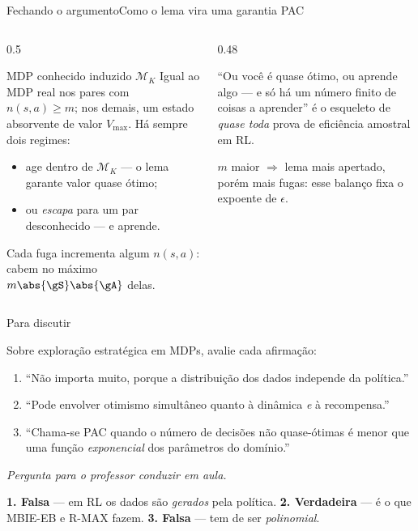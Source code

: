 \documentclass[aspectratio=169, 11pt]{beamer}
\newcommand{\paradiscussao}{\smallskip
  {\footnotesize\color{rlCinza}\itshape Pergunta para o professor conduzir em aula.}}
\newcommand{\Vmax}{V_{\max}}
\newcommand{\Mdp}{\mathcal{M}}
\begin{document}
\begin{frame}{Fechando o argumento}{Como o lema vira uma garantia PAC}
  \begin{columns}[T]
    \begin{column}{0.5\textwidth}
      \begin{defbox}{MDP conhecido induzido $\Mdp_K$}
        Igual ao MDP real nos pares com $n(s,a)\ge m$; nos demais, um estado absorvente
        de valor $\Vmax$. Há sempre dois regimes:
        \begin{itemize}
          \item age dentro de $\Mdp_K$ --- o lema garante valor quase ótimo;
          \item ou \emph{escapa} para um par desconhecido --- e aprende.
        \end{itemize}
      \end{defbox}
      {\small\color{rlCinza} Cada fuga incrementa algum $n(s,a)$: cabem no máximo
      $m\abs{\gS}\abs{\gA}$ delas.}
    \end{column}
    \begin{column}{0.48\textwidth}
      \begin{ideiabox}
        ``Ou você é quase ótimo, ou aprende algo --- e só há um número finito de coisas
        a aprender'' é o esqueleto de \emph{quase toda} prova de eficiência amostral em RL.
      \end{ideiabox}
      \begin{alertabox}
        $m$ maior $\Rightarrow$ lema mais apertado, porém mais fugas: esse balanço fixa
        o expoente de $\epsilon$.
      \end{alertabox}
    \end{column}
  \end{columns}
\end{frame}

\begin{frame}{Para discutir}
  \begin{quizbox}{}
    Sobre exploração estratégica em MDPs, avalie cada afirmação:
    \begin{enumerate}
      \item ``Não importa muito, porque a distribuição dos dados independe da política.''
      \item ``Pode envolver otimismo simultâneo quanto à dinâmica \emph{e} à recompensa.''
      \item ``Chama-se PAC quando o número de decisões não quase-ótimas é menor que uma
            função \emph{exponencial} dos parâmetros do domínio.''
    \end{enumerate}
    \paradiscussao
  \end{quizbox}
  \pause
  \begin{respbox}
    \textbf{1. Falsa} --- em RL os dados são \emph{gerados} pela política.\quad
    \textbf{2. Verdadeira} --- é o que MBIE-EB e R-MAX fazem.\quad
    \textbf{3. Falsa} --- tem de ser \emph{polinomial}.
  \end{respbox}
\end{frame}
\end{document}

